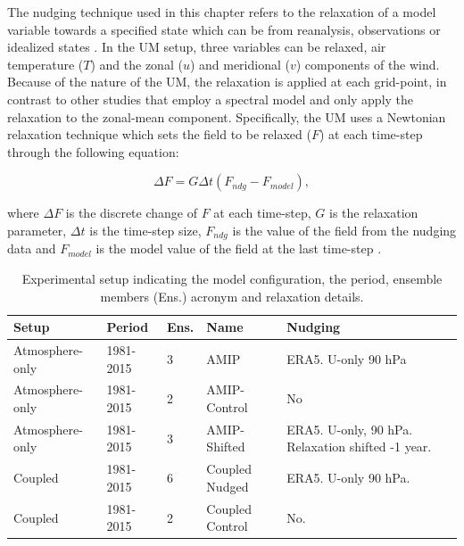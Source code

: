 The nudging technique used in this chapter refers to the relaxation of a model variable towards a specified state which can be from reanalysis, observations or idealized states \citep{gray2020,martin2021}. In the UM setup, three variables can be relaxed, air temperature ($T$) and the zonal ($u$) and meridional ($v$) components of the wind. Because of the nature of the UM, the relaxation is applied at each grid-point, in contrast to other studies \citep[e.g.][]{martin2021} that employ a spectral model and only apply the relaxation to the zonal-mean component. Specifically, the UM uses a Newtonian relaxation technique \citep{telford2008description,gray2020} which sets the field to be relaxed ($F$) at each time-step through the following equation:  


\begin{equation}
\Delta F=G\Delta t (F_{ndg}-F_{model}),
\end{equation}

\noindent where $\Delta F$ is the discrete change of $F$ at each time-step, $G$ is the relaxation parameter, $\Delta t$ is the time-step size, $F_{ndg}$ is the value of the field from the nudging data and $F_{model}$ is the model value of the field at the last time-step \citep{telford2008description}.


\begin{table}[t!]
\caption{Experimental setup indicating the model configuration, the period, ensemble members (Ens.) acronym and relaxation details.}
\begin{tabular}{p{3.2cm}|p{}|p{1.35cm}|p{3cm}|p{4.85cm}} \label{tab:nudg_exps}
Setup           & Period    & Ens.& Name            & Nudging                                          \\ \hline \hline
Atmosphere-only & 1981-2015 & 3                & AMIP            & ERA5. U-only 90 hPa                              \\
Atmosphere-only & 1981-2015 & 2                & AMIP-Control    & No                                               \\
Atmosphere-only & 1981-2015 & 3                & AMIP-Shifted    & ERA5. U-only, 90 hPa. Relaxation shifted -1 year. \\
Coupled         & 1981-2015 & 6                & Coupled Nudged     & ERA5. U-only 90 hPa.                             \\
Coupled         & 1981-2015 & 2                & Coupled Control & No.                                             
\end{tabular}
\end{table}



